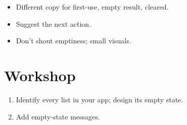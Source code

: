 \begin{recap}
\begin{itemize}[leftmargin=*]
  \item Different copy for first-use, empty result,
    cleared.
  \item Suggest the next action.
  \item Don't shout emptiness; small visuals.
\end{itemize}
\end{recap}

\section*{Workshop}

\begin{enumerate}[leftmargin=*]
  \item Identify every list in your app; design its
    empty state.
  \item Add empty-state messages.
\end{enumerate}

